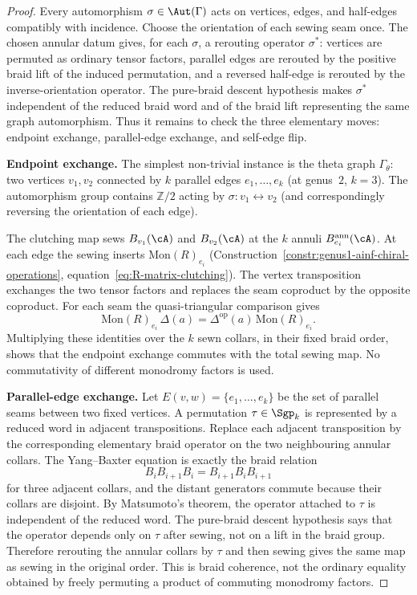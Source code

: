 \begin{proof}
Every automorphism $\sigma\in\Aut(\Gamma)$ acts on vertices, edges,
and half-edges compatibly with incidence.  Choose the orientation of
each sewing seam once.  The chosen annular datum gives, for each
$\sigma$, a rerouting operator $\sigma^\ast$: vertices are permuted
as ordinary tensor factors, parallel edges are rerouted by the
positive braid lift of the induced permutation, and a reversed
half-edge is rerouted by the inverse-orientation operator.
The pure-braid descent hypothesis makes $\sigma^\ast$ independent of
the reduced braid word and of the braid lift representing the same
graph automorphism.  Thus it remains to check the three elementary
moves: endpoint exchange, parallel-edge exchange, and self-edge flip.

\medskip
\noindent\textbf{Endpoint exchange.}
The simplest non-trivial instance is the theta graph
$\Gamma_\theta$: two vertices $v_1, v_2$ connected by $k$
parallel edges $e_1, \ldots, e_k$ (at genus~$2$, $k = 3$).
The automorphism group contains $\mathbb{Z}/2$ acting by
$\sigma \colon v_1 \leftrightarrow v_2$ (and correspondingly
reversing the orientation of each edge).

The clutching map sews $B_{v_1}(\cA)$ and $B_{v_2}(\cA)$ at the
$k$ annuli $B^{\mathrm{ann}}_{e_i}(\cA)$.  At each edge the sewing
inserts $\mathrm{Mon}(R)_{e_i}$
(Construction~\ref{constr:genus1-ainf-chiral-operations},
equation~\eqref{eq:R-matrix-clutching}).  The vertex
transposition exchanges the two tensor factors and replaces the
seam coproduct by the opposite coproduct.  For each seam the
quasi-triangular comparison gives
\[
\mathrm{Mon}(R)_{e_i}\,\Delta(a)
=
\Delta^{\mathrm{op}}(a)\,\mathrm{Mon}(R)_{e_i}.
\]
Multiplying these identities over the $k$ sewn collars, in their
fixed braid order, shows that the endpoint exchange commutes with
the total sewing map.  No commutativity of different monodromy
factors is used.

\medskip
\noindent\textbf{Parallel-edge exchange.}
Let $E(v,w)=\{e_1,\ldots,e_k\}$ be the set of parallel seams between
two fixed vertices.  A permutation $\tau\in\Sgp_k$ is represented by a
reduced word in adjacent transpositions.  Replace each adjacent
transposition by the corresponding elementary braid operator on the
two neighbouring annular collars.  The Yang--Baxter equation is
exactly the braid relation
\[
B_iB_{i+1}B_i=B_{i+1}B_iB_{i+1}
\]
for three adjacent collars, and the distant generators commute
because their collars are disjoint.  By Matsumoto's theorem, the
operator attached to $\tau$ is independent of the reduced word.
The pure-braid descent hypothesis says that the operator depends only
on $\tau$ after sewing, not on a lift in the braid group.  Therefore
rerouting the annular collars by $\tau$ and then sewing gives the
same map as sewing in the original order.  This is braid coherence,
not the ordinary equality obtained by freely permuting a product of
commuting monodromy factors.


\end{proof}

